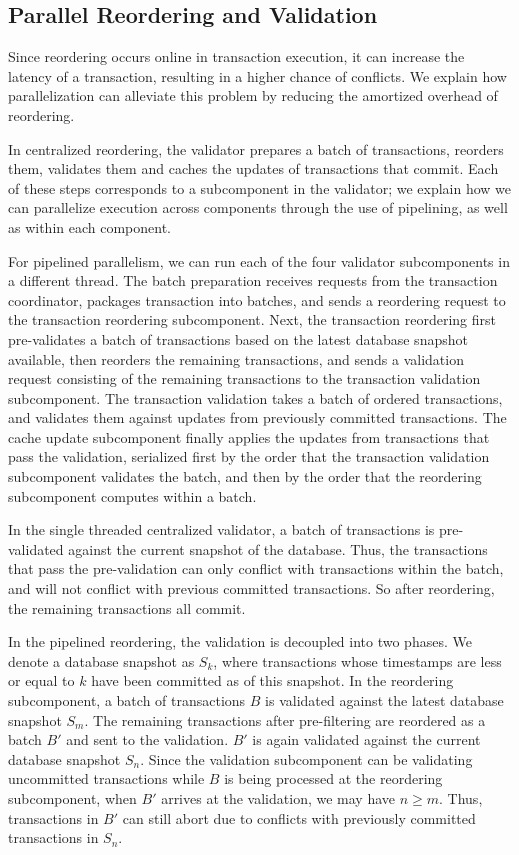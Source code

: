 \subsection{Parallel Reordering and Validation}
\label{subsec:validator_reordering:parallel}
Since reordering occurs online in transaction execution, it can increase the latency of a transaction, resulting in a higher chance of conflicts. We explain how parallelization can alleviate this problem by reducing the amortized overhead of reordering.

In centralized reordering, the validator prepares a batch of transactions, reorders them,  validates them and caches the updates of transactions that commit. Each of these steps corresponds to a subcomponent in the validator; we explain how we can parallelize execution across components through the use of pipelining, as well as within each component. 

For pipelined parallelism, we can run each of the four validator subcomponents in a different thread. The batch preparation receives requests from the transaction coordinator, packages transaction into batches, and sends a reordering request to the transaction reordering subcomponent. Next, the transaction reordering first pre-validates a batch of transactions based on the latest database snapshot available, then reorders the remaining transactions, and sends a validation request consisting of the remaining transactions to the transaction validation subcomponent. 
The transaction validation takes a batch of ordered transactions, and validates them against updates from previously committed transactions. The cache update subcomponent finally applies the updates from transactions that pass the validation, serialized first by the order that the transaction validation subcomponent validates the batch, and then by the order that the reordering subcomponent computes within a batch. 

In the single threaded centralized validator, a batch of transactions is pre-validated against the current snapshot of the database. Thus, the transactions that pass the pre-validation can only conflict with transactions within the batch, and will not conflict with previous committed transactions. So after reordering, the remaining transactions all commit.

In the pipelined reordering, the validation is decoupled into two phases. We denote a database snapshot as $S_k$, where transactions whose timestamps are less or equal to $k$ have been committed as of this snapshot. In the reordering subcomponent, a batch of transactions $B$ is validated against the latest database snapshot $S_m$. The remaining transactions after pre-filtering are reordered as a batch $B'$ and sent to the validation. $B'$ is again validated against the current database snapshot $S_n$. Since the validation subcomponent can be validating uncommitted transactions while $B$ is being processed at the reordering subcomponent, when $B'$ arrives at the validation,  we may have $n\geq m$. Thus, transactions in $B'$ can still abort due to conflicts with previously committed transactions in $S_n$.

